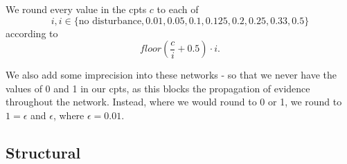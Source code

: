 \begin{enumerate}
We round every value in the cpts $c$ to each of \[i, i \in \{\text{no disturbance}, 0.01, 0.05, 0.1, 0.125, 0.2, 0.25, 0.33, 0.5\} \] according to \[ floor(\frac{c}{i} + 0.5) \cdot i.\]

We also add some imprecision into these networks - so that we never have the values of 0 and 1 in our cpts, as this blocks the propagation of evidence throughout the network. Instead, where we would round to 0 or 1, we round to $1 = \epsilon$ and $\epsilon$, where $\epsilon = 0.01$.

\end{enumerate}

\subsection{Structural}

